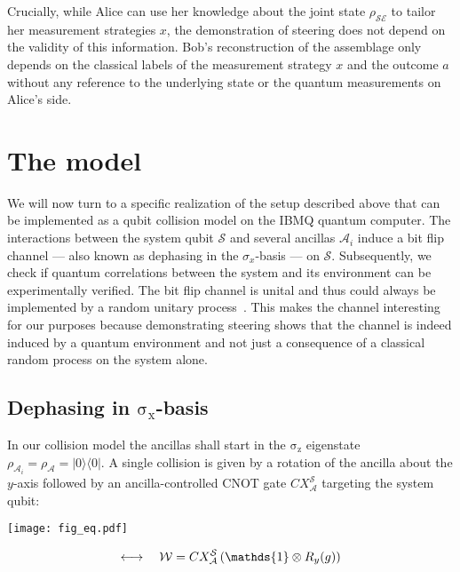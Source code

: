 \documentclass[aps,pra,twocolumn,superscriptaddress,showemail,showpacs,longbibliography]{revtex4-2}
\newcommand{\kb}[2]{|#1\rangle\langle#2|} %
\newcommand{\id}{\mathds{1}} %
\newcommand{\Sys}{\mathcal{S}} %
\newcommand{\Anc}{\mathcal{A}} %
\newcommand{\Env}{\mathcal{E}} %
\newcommand{\W}{\mathcal{W}}
\newcommand{\sigmax}{\operatorname{\sigma_x}}
\newcommand{\sigmaz}{\operatorname{\sigma_z}}
\begin{document}
Crucially, while Alice can use her knowledge about the joint state $\rho_{\Sys\Env}$ to tailor her measurement strategies $x$, the demonstration of steering does not depend on the validity of this information. Bob's reconstruction of the assemblage only depends on the classical labels of the measurement strategy $x$ and the outcome $a$ without any reference to the underlying state or the quantum measurements on Alice's side. 


\section{The model}
\label{sec:experiment}
We will now turn to a specific realization of the setup described above that can be implemented as a qubit collision model on the IBMQ quantum computer. The interactions between the system qubit $\Sys$ and several ancillas $\Anc_i$ induce a bit flip channel --- also known as dephasing in the $\sigma_x$-basis --- on $\Sys$. Subsequently, we check if quantum correlations between the system and its environment can be experimentally verified. The bit flip channel is unital and thus could always be implemented by a random unitary process~\cite{kummererEssentiallyCommutativeDilations1987,landauBirkhoffTheoremDoubly1993,buscemiInvertingQuantumDecoherence2005,perniceSystemEnvironmentCorrelations2012}. This makes the channel interesting for our purposes because demonstrating steering shows that the channel is indeed induced by a quantum environment and not just a consequence of a classical random process on the system alone.

\subsection{Dephasing in $\sigmax$-basis}
In our collision model the ancillas shall start in the $\sigmaz$ eigenstate  $\rho_{\Anc_i}=\rho_\Anc =\kb{0}{0}$. A single collision is given by a rotation of the ancilla about the $y$-axis followed by an ancilla-controlled CNOT gate $CX^\Sys_\Anc$ targeting the system qubit:
\begin{minipage}{\linewidth}
\vspace{0.7em}
\begin{minipage}{0.35\linewidth}
\raggedright
\texttt{[image: fig\_eq.pdf]}
\end{minipage} \hfill
\begin{minipage}{0.64\linewidth}
\vspace{-0.5cm}
\begin{equation}
    \longleftrightarrow \quad \W = CX^\Sys_\Anc \, \qty(\id \otimes R_y(g))
\end{equation}
\end{minipage} 
\vspace{0.7em}
\end{minipage}
\end{document}
